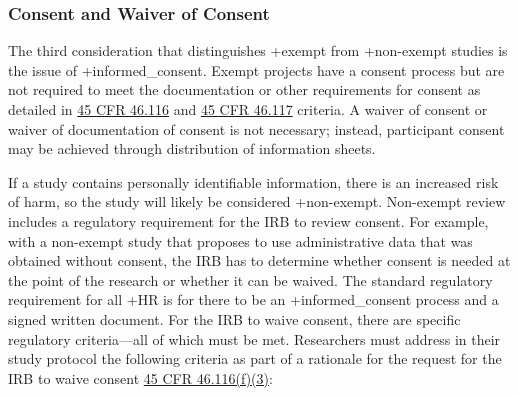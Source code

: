\documentclass[
]{book}
\begin{document}
\hypertarget{consent-and-waiver-of-consent}{%
\subsubsection{Consent and Waiver of Consent}\label{consent-and-waiver-of-consent}}

The third consideration that distinguishes +exempt\textbar{} from +non-exempt\textbar{} studies is the issue of +informed\_consent\textbar. Exempt projects have a consent process but are not required to meet the documentation or other requirements for consent as detailed in \href{https://www.law.cornell.edu/cfr/text/45/46.116}{45 CFR 46.116} and \href{https://www.law.cornell.edu/cfr/text/45/46.117}{45 CFR 46.117} criteria. A waiver of consent or waiver of documentation of consent is not necessary; instead, participant consent may be achieved through distribution of information sheets.

If a study contains personally identifiable information, there is an increased risk of harm, so the study will likely be considered +non-exempt\textbar. Non-exempt review includes a regulatory requirement for the IRB to review consent. For example, with a non-exempt study that proposes to use administrative data that was obtained without consent, the IRB has to determine whether consent is needed at the point of the research or whether it can be waived. The standard regulatory requirement for all +HR\textbar{} is for there to be an +informed\_consent\textbar{} process and a signed written document. For the IRB to waive consent, there are specific regulatory criteria---all of which must be met. Researchers must address in their study protocol the following criteria as part of a rationale for the request for the IRB to waive consent \href{https://www.law.cornell.edu/cfr/text/45/46.116}{45 CFR 46.116(f)(3)}:
\end{document}

